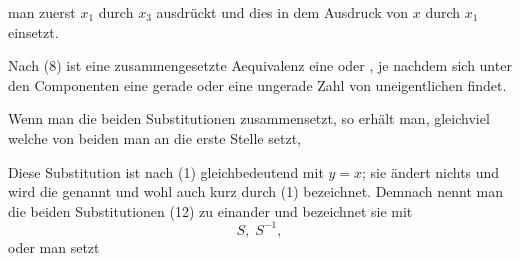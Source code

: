 man zuerst $x_1$ durch $x_3$ ausdrückt und dies in dem Ausdruck
von $x$ durch $x_1$ einsetzt.

Nach (8) ist eine zusammengesetzte Aequivalenz eine  oder , je nachdem sich unter den Componenten eine gerade oder eine ungerade Zahl von uneigentlichen findet.

Wenn man die beiden Substitutionen
zusammensetzt, so erhält man, gleichviel welche von beiden man an die erste Stelle setzt,

Diese Substitution ist nach (1) gleichbedeutend mit $y = x$; sie ändert nichts und wird die  genannt und wohl auch kurz durch (1) bezeichnet. Demnach nennt man die beiden Substitutionen (12) zu einander  und bezeichnet sie mit
\[
S, \; S^{-1},
\]
oder man setzt

